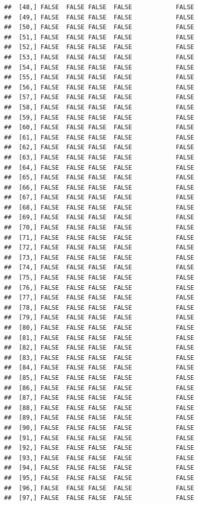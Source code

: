 \documentclass[
  english,
  man,floatsintext]{apa6}
\begin{document}
\begin{verbatim}
##  [48,] FALSE  FALSE FALSE  FALSE            FALSE
##  [49,] FALSE  FALSE FALSE  FALSE            FALSE
##  [50,] FALSE  FALSE FALSE  FALSE            FALSE
##  [51,] FALSE  FALSE FALSE  FALSE            FALSE
##  [52,] FALSE  FALSE FALSE  FALSE            FALSE
##  [53,] FALSE  FALSE FALSE  FALSE            FALSE
##  [54,] FALSE  FALSE FALSE  FALSE            FALSE
##  [55,] FALSE  FALSE FALSE  FALSE            FALSE
##  [56,] FALSE  FALSE FALSE  FALSE            FALSE
##  [57,] FALSE  FALSE FALSE  FALSE            FALSE
##  [58,] FALSE  FALSE FALSE  FALSE            FALSE
##  [59,] FALSE  FALSE FALSE  FALSE            FALSE
##  [60,] FALSE  FALSE FALSE  FALSE            FALSE
##  [61,] FALSE  FALSE FALSE  FALSE            FALSE
##  [62,] FALSE  FALSE FALSE  FALSE            FALSE
##  [63,] FALSE  FALSE FALSE  FALSE            FALSE
##  [64,] FALSE  FALSE FALSE  FALSE            FALSE
##  [65,] FALSE  FALSE FALSE  FALSE            FALSE
##  [66,] FALSE  FALSE FALSE  FALSE            FALSE
##  [67,] FALSE  FALSE FALSE  FALSE            FALSE
##  [68,] FALSE  FALSE FALSE  FALSE            FALSE
##  [69,] FALSE  FALSE FALSE  FALSE            FALSE
##  [70,] FALSE  FALSE FALSE  FALSE            FALSE
##  [71,] FALSE  FALSE FALSE  FALSE            FALSE
##  [72,] FALSE  FALSE FALSE  FALSE            FALSE
##  [73,] FALSE  FALSE FALSE  FALSE            FALSE
##  [74,] FALSE  FALSE FALSE  FALSE            FALSE
##  [75,] FALSE  FALSE FALSE  FALSE            FALSE
##  [76,] FALSE  FALSE FALSE  FALSE            FALSE
##  [77,] FALSE  FALSE FALSE  FALSE            FALSE
##  [78,] FALSE  FALSE FALSE  FALSE            FALSE
##  [79,] FALSE  FALSE FALSE  FALSE            FALSE
##  [80,] FALSE  FALSE FALSE  FALSE            FALSE
##  [81,] FALSE  FALSE FALSE  FALSE            FALSE
##  [82,] FALSE  FALSE FALSE  FALSE            FALSE
##  [83,] FALSE  FALSE FALSE  FALSE            FALSE
##  [84,] FALSE  FALSE FALSE  FALSE            FALSE
##  [85,] FALSE  FALSE FALSE  FALSE            FALSE
##  [86,] FALSE  FALSE FALSE  FALSE            FALSE
##  [87,] FALSE  FALSE FALSE  FALSE            FALSE
##  [88,] FALSE  FALSE FALSE  FALSE            FALSE
##  [89,] FALSE  FALSE FALSE  FALSE            FALSE
##  [90,] FALSE  FALSE FALSE  FALSE            FALSE
##  [91,] FALSE  FALSE FALSE  FALSE            FALSE
##  [92,] FALSE  FALSE FALSE  FALSE            FALSE
##  [93,] FALSE  FALSE FALSE  FALSE            FALSE
##  [94,] FALSE  FALSE FALSE  FALSE            FALSE
##  [95,] FALSE  FALSE FALSE  FALSE            FALSE
##  [96,] FALSE  FALSE FALSE  FALSE            FALSE
##  [97,] FALSE  FALSE FALSE  FALSE            FALSE

\end{verbatim}
\end{document}
